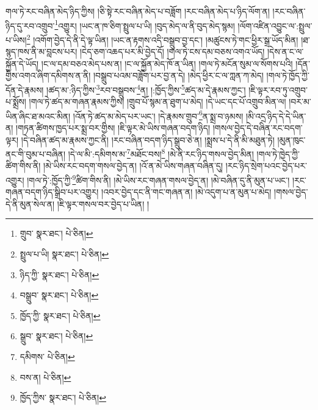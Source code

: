 གལ་ཏེ་རང་བཞིན་མེད་ཉིད་ཀྱིས། །ཅི་སྟེ་རང་བཞིན་མེད་པ་བཟློག །རང་བཞིན་མེད་པ་ཉིད་ལོག་ན། །རང་བཞིན་ཉིད་དུ་རབ་འགྲུབ་\footnote{གྲུབ་  སྣར་ཐང་།  པེ་ཅིན། }འགྱུར། །ཡང་ན་ཁ་ཅིག་སྤྲུལ་པ་ཡི། །བུད་མེད་ལ་ནི་བུད་མེད་སྙམ། །ལོག་འཛིན་འབྱུང་ལ་:སྤྲུལ་པ་ཡིས།\footnote{སྤྲུལ་པ་ཡི།  སྣར་ཐང་།  པེ་ཅིན། } །འགོག་བྱེད་དེ་ནི་དེ་ལྟ་ཡིན། །ཡང་ན་རྟགས་འདི་བསྒྲུབ་བྱ་དང་། །མཚུངས་ཏེ་གང་ཕྱིར་སྒྲ་ཡོད་མིན། །ཐ་སྙད་ཁས་ནི་མ་བླངས་པར། །ངེད་ཅག་འཆད་པར་མི་བྱེད་དོ། །གལ་ཏེ་ངས་དམ་བཅས་འགའ་ཡོད། །དེས་ན་ང་ལ་སྐྱོན་དེ་ཡོད། །ང་ལ་དམ་བཅའ་མེད་པས་ན། །ང་ལ་སྐྱོན་མེད་ཁོ་ན་ཡིན། །གལ་ཏེ་མངོན་སུམ་ལ་སོགས་པའི། །དོན་གྱིས་འགའ་ཞིག་དམིགས་ན་ནི། །བསྒྲུབ་པའམ་བཟློག་པར་བྱ་ན་དེ། །མེད་ཕྱིར་ང་ལ་ཀླན་ཀ་མེད། །གལ་ཏེ་ཁྱོད་ཀྱི་དོན་དེ་རྣམས། །ཚད་མ་:ཉིད་ཀྱིས་\footnote{ཉིད་ཀྱི་  སྣར་ཐང་།  པེ་ཅིན། }རབ་བསྒྲུབས་\footnote{བསྒྲུབ་  སྣར་ཐང་།  པེ་ཅིན། }ན། །:ཁྱོད་ཀྱིས་\footnote{ཁྱོད་ཀྱི་  སྣར་ཐང་།  པེ་ཅིན། }ཚད་མ་དེ་རྣམས་ཀྱང་། །ཇི་ལྟར་རབ་ཏུ་འགྲུབ་པ་སྨྲོས། །གལ་ཏེ་ཚད་མ་གཞན་རྣམས་ཀྱིས། །གྲུབ་པོ་སྙམ་ན་ཐུག་པ་མེད། །དེ་ཡང་དང་པོ་འགྲུབ་མིན་ལ། །བར་མ་ཡིན་ཞིང་ཐ་མའང་མིན། །འོན་ཏེ་ཚད་མ་མེད་པར་ཡང་། །དེ་རྣམས་གྲུབ་\footnote{སྒྲུབ་  སྣར་ཐང་།  པེ་ཅིན། }ན་སྨྲ་བ་ཉམས། །མི་འདྲ་ཉིད་དེ་དེ་ཡིན་ན། །གཏན་ཚིགས་ཁྱད་པར་སྨྲ་བར་གྱིས། །ཇི་ལྟར་མེ་ཡིས་གཞན་བདག་ཉིད། །གསལ་བྱེད་དེ་བཞིན་རང་བདག་ལྟར། །དེ་བཞིན་ཚད་མ་རྣམས་ཀྱང་ནི། །རང་བཞིན་བདག་ཉིད་སྒྲུབ་ཅེ་ན། །སྨྲས་པ་དེ་ནི་མི་མཐུན་ཏེ། །མུན་ཁུང་ནང་གི་བུམ་པ་བཞིན། །དེ་ལ་མི་:དམིགས་མ་\footnote{དམིགས་  པེ་ཅིན། }མཐོང་བས།\footnote{བས་ན།  པེ་ཅིན། } །མེ་ནི་རང་ཉིད་གསལ་བྱེད་མིན། །གལ་ཏེ་ཁྱེད་ཀྱི་ཚིག་གིས་ནི། །མེ་ཡིས་རང་བདག་གསལ་བྱེད་ན། །འོ་ན་མེ་ཡིས་གཞན་བཞིན་དུ། །རང་ཉིད་སྲེག་པའང་བྱེད་པར་འགྱུར། །གལ་ཏེ་:ཁྱོད་ཀྱི་\footnote{ཁྱོད་ཀྱིས་  སྣར་ཐང་།  པེ་ཅིན། }ཚིག་གིས་ནི། །མེ་ཡིས་རང་གཞན་གསལ་བྱེད་ན། །མེ་བཞིན་དུ་ནི་མུན་པ་ཡང་། །རང་གཞན་བདག་ཉིད་སྒྲིབ་པར་འགྱུར། །འབར་བྱེད་དང་ནི་གང་གཞན་ན། །མེ་འདུག་པ་ན་མུན་པ་མེད། །གསལ་བྱེད་དེ་ནི་མུན་སེལ་ན། །ཇི་ལྟར་གསལ་བར་བྱེད་པ་ཡིན། །
